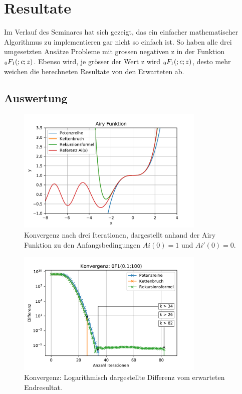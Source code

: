 %
%
%
\section{Resultate
\label{0f1:section:teil3}}
Im Verlauf des Seminares hat sich gezeigt, 
das ein einfacher mathematischer Algorithmus zu implementieren gar nicht so einfach ist.
So haben alle drei umgesetzten Ansätze Probleme mit grossen negativen z in der Funktion $\mathstrut_0F_1(;c;z)$.
Ebenso wird, je grösser der Wert z wird $\mathstrut_0F_1(;c;z)$, desto mehr weichen die berechneten Resultate
von den Erwarteten ab. \cite{0f1:wolfram-0f1}

\subsection{Auswertung
\label{0f1:subsection:auswertung}}
\begin{figure}
    \centering
    \includegraphics[width=0.8\textwidth]{papers/0f1/images/konvergenzAiry.pdf}
    \caption{Konvergenz nach drei Iterationen, dargestellt anhand der Airy Funktion zu den Anfangsbedingungen $Ai(0)=1$ und $Ai'(0)=0$.
    \label{0f1:ausblick:plot:airy:konvergenz}}
\end{figure}

\begin{figure}
    \centering
    \includegraphics[width=0.8\textwidth]{papers/0f1/images/konvergenzPositiv.pdf}
    \caption{Konvergenz: Logarithmisch dargestellte Differenz vom erwarteten Endresultat.
    \label{0f1:ausblick:plot:konvergenz:positiv}}
\end{figure}


